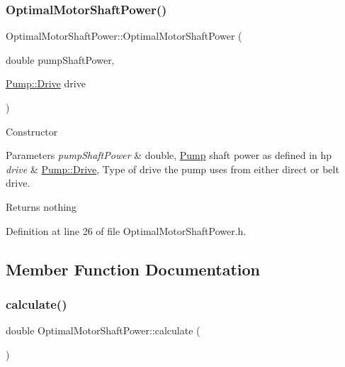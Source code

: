 \subsubsection{\texorpdfstring{Optimal\+Motor\+Shaft\+Power()}{OptimalMotorShaftPower()}\hspace{0.1cm}{\footnotesize\ttfamily [3/3]}}
{\footnotesize\ttfamily Optimal\+Motor\+Shaft\+Power\+::\+Optimal\+Motor\+Shaft\+Power (\begin{DoxyParamCaption}\item[{double}]{pump\+Shaft\+Power,  }\item[{\hyperlink{class_pump_a32bf0ade131a11bb3b3fb374f638e983}{Pump\+::\+Drive}}]{drive }\end{DoxyParamCaption})\hspace{0.3cm}{\ttfamily [inline]}}

Constructor 
\begin{DoxyParams}{Parameters}
{\em pump\+Shaft\+Power} & double, \hyperlink{class_pump}{Pump} shaft power as defined in hp \\
\hline
{\em drive} & \hyperlink{class_pump_a32bf0ade131a11bb3b3fb374f638e983}{Pump\+::\+Drive}, Type of drive the pump uses from either direct or belt drive. \\
\hline
\end{DoxyParams}
\begin{DoxyReturn}{Returns}
nothing 
\end{DoxyReturn}


Definition at line 26 of file Optimal\+Motor\+Shaft\+Power.\+h.



\subsection{Member Function Documentation}
\mbox{\label{class_optimal_motor_shaft_power_a34d47733928ae518fa6f3d08b7d8a12e}} 
\subsubsection{\texorpdfstring{calculate()}{calculate()}\hspace{0.1cm}{\footnotesize\ttfamily [1/3]}}
{\footnotesize\ttfamily double Optimal\+Motor\+Shaft\+Power\+::calculate (\begin{DoxyParamCaption}{ }\end{DoxyParamCaption})}



